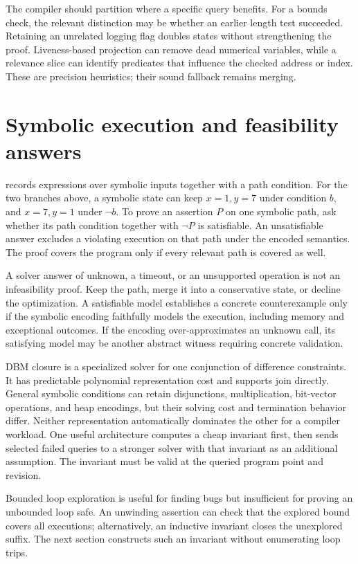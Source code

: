 The compiler should partition where a specific query benefits.
For a bounds check, the relevant distinction may be whether an earlier length test succeeded.
Retaining an unrelated logging flag doubles states without strengthening the proof.
Liveness-based projection can remove dead numerical variables, while a relevance slice can identify predicates that influence the checked address or index.
These are precision heuristics; their sound fallback remains merging.

\section{Symbolic execution and feasibility answers}
\label{sec:ch43-symbolic}

 records expressions over symbolic inputs together with a path condition.
For the two branches above, a symbolic state can keep $x=1,y=7$ under condition $b$, and $x=7,y=1$ under $\neg b$.
To prove an assertion $P$ on one symbolic path, ask whether its path condition together with $\neg P$ is satisfiable.
An unsatisfiable answer excludes a violating execution on that path under the encoded semantics.
The proof covers the program only if every relevant path is covered as well.

A solver answer of unknown, a timeout, or an unsupported operation is not an infeasibility proof.
Keep the path, merge it into a conservative state, or decline the optimization.
A satisfiable model establishes a concrete counterexample only if the symbolic encoding faithfully models the execution, including memory and exceptional outcomes.
If the encoding over-approximates an unknown call, its satisfying model may be another abstract witness requiring concrete validation.

DBM closure is a specialized solver for one conjunction of difference constraints.
It has predictable polynomial representation cost and supports join directly.
General symbolic conditions can retain disjunctions, multiplication, bit-vector operations, and heap encodings, but their solving cost and termination behavior differ.
Neither representation automatically dominates the other for a compiler workload.
One useful architecture computes a cheap invariant first, then sends selected failed queries to a stronger solver with that invariant as an additional assumption.
The invariant must be valid at the queried program point and revision.

Bounded loop exploration is useful for finding bugs but insufficient for proving an unbounded loop safe.
An unwinding assertion can check that the explored bound covers all executions; alternatively, an inductive invariant closes the unexplored suffix.
The next section constructs such an invariant without enumerating loop trips.


